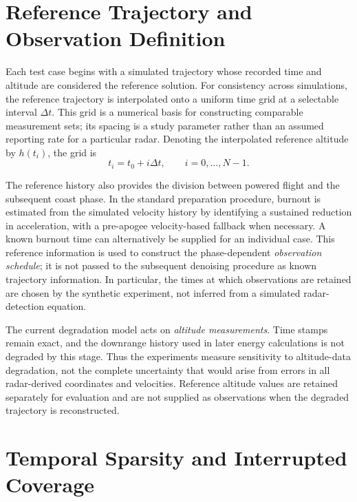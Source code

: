 \section{Reference Trajectory and Observation Definition}
\label{sec:noise-reference}

Each test case begins with a simulated trajectory whose recorded time and
altitude are considered the reference solution. For consistency across
simulations, the reference trajectory is interpolated onto a uniform time
grid at a selectable interval $\Delta t$. This grid is a
numerical basis for constructing comparable measurement sets; its spacing
is a study parameter rather than an assumed reporting rate for a
particular radar. Denoting the interpolated reference altitude by $h(t_i)$,
the grid is
\begin{equation}
    t_i=t_0+i\Delta t,\qquad i=0,\ldots,N-1.
    \label{eq:noise-time-grid}
\end{equation}

The reference history also provides the division between powered flight
and the subsequent coast phase. In the standard preparation procedure,
burnout is estimated from the simulated velocity history by identifying a
sustained reduction in acceleration, with a pre-apogee velocity-based
fallback when necessary. A known burnout time can alternatively be
supplied for an individual case. This reference information is used to
construct the phase-dependent \emph{observation schedule}; it is not
passed to the subsequent denoising procedure as known trajectory
information. In particular, the times at which observations are
retained are chosen by the synthetic experiment, not inferred from
a simulated radar-detection equation.

The current degradation model acts on \emph{altitude measurements}.
Time stamps remain exact, and the downrange history used in later
energy calculations is not degraded by this stage. Thus the
experiments measure sensitivity to altitude-data degradation,
not the complete uncertainty that would arise from errors in
all radar-derived coordinates and velocities. Reference altitude
values are retained separately for evaluation and are not supplied
as observations when the degraded trajectory is reconstructed.

\section{Temporal Sparsity and Interrupted Coverage}
\label{sec:noise-sparsity}

